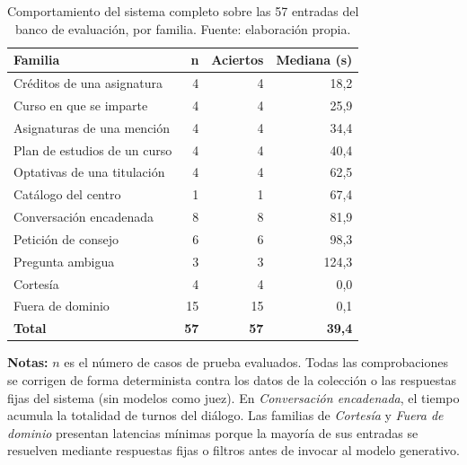 
\begin{table}[htbp]
  \centering
  \small
  \caption[Evaluación del sistema completo]{%
    Comportamiento del sistema completo sobre las 57
      entradas del banco de evaluación, por familia. Fuente: elaboración
      propia.}
  \label{tab:evaluacion_sistema}
  \begin{tabular}{@{}lrrr@{}}
    \toprule
    \textbf{Familia}                    & \textbf{n} & \textbf{Aciertos}
                                        & \textbf{Mediana (s)}             \\
    \midrule
    Créditos de una asignatura          & 4          & 4  & 18,2 \\
    Curso en que se imparte             & 4          & 4  & 25,9 \\
    Asignaturas de una mención          & 4          & 4  & 34,4 \\
    Plan de estudios de un curso        & 4          & 4  & 40,4 \\
    Optativas de una titulación         & 4          & 4  & 62,5 \\
    Catálogo del centro                 & 1          & 1  & 67,4 \\
    \midrule
    Conversación encadenada             & 8          & 8  & 81,9 \\
    Petición de consejo                 & 6          & 6  & 98,3 \\
    Pregunta ambigua                    & 3          & 3  & 124,3 \\
    Cortesía                            & 4          & 4  & 0,0 \\
    Fuera de dominio                    & 15         & 15 & 0,1 \\
    \midrule
    \textbf{Total}                      & \textbf{57} & \textbf{57} & \textbf{39,4} \\
    \bottomrule
  \end{tabular}
  \begin{minipage}{0.95\textwidth}
    \vspace{4pt}
    \tiny
    \textbf{Notas:} $n$ es el número de casos de prueba evaluados. Todas las comprobaciones se corrigen de forma determinista contra los datos de la colección o las respuestas fijas del sistema (sin modelos como juez). En \textit{Conversación encadenada}, el tiempo acumula la totalidad de turnos del diálogo. Las familias de \textit{Cortesía} y \textit{Fuera de dominio} presentan latencias mínimas porque la mayoría de sus entradas se resuelven mediante respuestas fijas o filtros antes de invocar al modelo generativo.
  \end{minipage}
\end{table}
